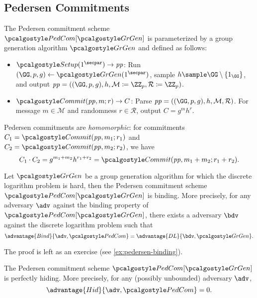 \subsection{Pedersen Commitments}

\begin{definition}
  The Pedersen commitment scheme\\ $\algo{PedCom}[\grgen]$ is parameterized by a group generation algorithm $\grgen$ and defined as follows:
  \begin{itemize}
  \item $\algo{Setup}(1^\secpar) \rightarrow \params$: Run $\gparam \gets \grgen(1^\secpar)$, sample $h \sample \GG \setminus \{1_\GG\}$, and output $\params = (\gparam, h, \mathcal{M} \defeq \ZZ_p, \mathcal{R} \defeq \ZZ_p)$.
  \item $\algo{Commit}(\params, m; r) \rightarrow C$: Parse $\params = ((\GG, p, g), h, \mathcal{M}, \mathcal{R})$. For message $m \in \mathcal{M}$ and randomness $r \in \mathcal{R}$, output $C = g^m h^r$.
  \end{itemize}
\end{definition}

\begin{remark}
  Pedersen commitments are \emph{homomorphic}: for commitments $C_1 = \algo{Commit}(\params, m_1; r_1)$ and $C_2 = \algo{Commit}(\params, m_2; r_2)$, we have
  \[
  C_1 \cdot C_2 = g^{m_1 + m_2} h^{r_1 + r_2} = \algo{Commit}(\params, m_1 + m_2; r_1 + r_2).
  \]
\end{remark}

\begin{theorem}\label{thm:pedersen-binding}
  Let $\grgen$ be a group generation algorithm for which the discrete logarithm problem is hard, then the Pedersen commitment scheme $\algo{PedCom}[\grgen]$ is binding.
  More precisely, for any \ppt adversary $\adv$ against the binding property of $\algo{PedCom}[\grgen]$, there exists a \ppt adversary $\bdv$ against the discrete logarithm problem such that
  \[
  \advantage{Bind}{\adv, \algo{PedCom}} = \advantage{DL}{\bdv, \grgen}.
  \]
\end{theorem}

The proof is left as an exercise (see \autoref{ex:pedersen-binding}).

\begin{theorem}\label{thm:pedersen-hiding}
  The Pedersen commitment scheme $\algo{PedCom}[\grgen]$ is perfectly hiding.
  More precisely, for any (possibly unbounded) adversary $\adv$,
  \[
  \advantage{Hid}{\adv, \algo{PedCom}} = 0.
  \]
\end{theorem}

